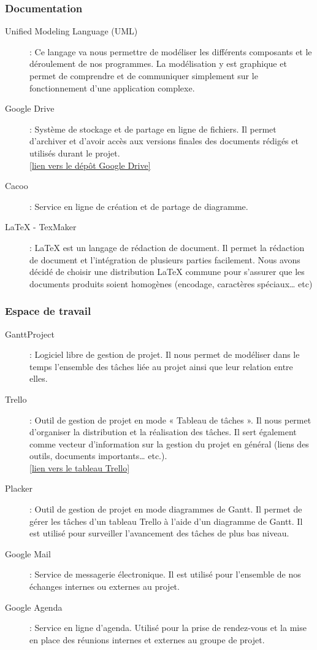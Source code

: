 \documentclass[10pt,a4paper]{article}
\begin{document}
\subsubsection{Documentation}
\begin{description}
\item [Unified Modeling Language (UML)] : Ce langage va nous permettre de modéliser les différents composants et le déroulement de nos programmes. La modélisation y est graphique et permet de comprendre et de communiquer simplement sur le fonctionnement d'une application complexe.
\item [Google Drive] : Système de stockage et de partage en ligne de fichiers. Il permet d'archiver et d'avoir accès aux versions finales des documents rédigés et utilisés durant le projet. \\
\href{https://drive.google.com/drive/folders/0B17hXXH2aZiVb1ZiNlhpMWk4OFE?usp=sharing}{[lien vers le dépôt Google Drive]}
\item [Cacoo] : Service en ligne de création et de partage de diagramme.
\item [LaTeX - TexMaker] : LaTeX est un langage de rédaction de document. Il permet la rédaction de document et l'intégration de plusieurs parties facilement. Nous avons décidé de choisir une distribution LaTeX commune pour s'assurer que les documents produits soient homogènes (encodage, caractères spéciaux… etc)
\end{description}

\subsubsection{Espace de travail}
\begin{description}
\item [GanttProject] : Logiciel libre de gestion de projet. Il nous permet de modéliser dans le temps l'ensemble des tâches liée au projet ainsi que leur relation entre elles.
\item [Trello] : Outil de gestion de projet en mode « Tableau de tâches ». Il nous permet d'organiser la distribution et la réalisation des tâches. Il sert également comme vecteur d'information sur la gestion du projet en général (liens des outils, documents importants… etc.).\\ \href{https://trello.com/b/eJKigNIz}{[lien vers le tableau Trello]}
\item [Placker] : Outil de gestion de projet en mode diagrammes de Gantt. Il permet de gérer les tâches d'un tableau Trello à l'aide d'un diagramme de Gantt. Il est utilisé pour surveiller l'avancement des tâches de plus bas niveau.
\item [Google Mail] : Service de messagerie électronique. Il est utilisé pour l’ensemble de nos échanges internes ou externes au projet.
\item [Google Agenda] : Service en ligne d'agenda. Utilisé pour la prise de rendez-vous et la mise en place des réunions internes et externes au groupe de projet. 
\end{description}
 
\end{document}

